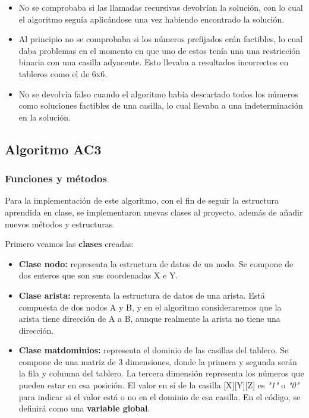 \documentclass[12pt]{article}
\begin{document}
\begin{itemize}
    \item No se comprobaba si las llamadas recursivas devolvían la solución, con lo cual el algoritmo seguía aplicándose 
    una vez habiendo encontrado la solución.

    \item Al principio no se comprobaba si los números prefijados erán factibles, lo cual daba problemas en el momento 
    en que uno de estos tenía una una restricción binaria con una casilla adyacente. Esto llevaba a resultados incorrectos en 
    tableros como el de 6x6.

    \item No se devolvía falso cuando el algoritmo había descartado todos los números como soluciones factibles de una casilla, lo 
    cual llevaba a una indeterminación en la solución.
\end{itemize}

\subsection{Algoritmo AC3}

\subsubsection{Funciones y métodos}

Para la implementación de este algoritmo, con el fin de seguir la estructura aprendida en clase, se implementaron 
nuevas clases al proyecto, además de añadir nuevos métodos y estructuras.

Primero veamos las \textbf{clases} creadas:

\begin{itemize}
    \item \textbf{Clase nodo:} representa la estructura de datos de un nodo. Se compone de dos enteros que son
    sus coordenadas X e Y.
    \item \textbf{Clase arista:} representa la estructura de datos de una arista. Está compuesta de dos nodos A y B, y
    en el algoritmo consideraremos que la arista tiene dirección de A a B, aunque realmente la arista no tiene una dirección.
    
    \item \textbf{Clase matdominios:} representa el dominio de las casillas del tablero. Se compone de una matriz de 3 dimensiones, 
    donde la primera y segunda serán la fila y columna del tablero. La tercera dimensión representa los números que pueden estar en 
    esa posición. El valor en sí de la casilla [X][Y][Z] es \textit{"1"} o \textit{"0"} para indicar si el valor está o no en el dominio de esa casilla.
    En el código, se definirá como una \textbf{variable global}.
\end{itemize}
\end{document}
